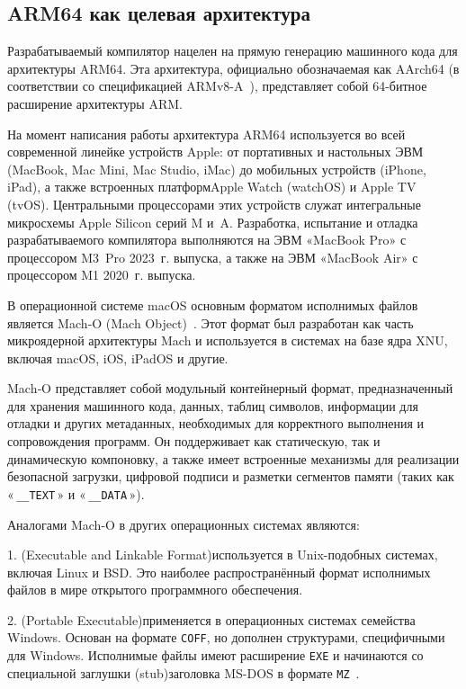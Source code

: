 \documentclass[utf8]{lgu}
\newcommand{\tire}{\unskip\nobreak\thinspace\textemdash\thinspace}
\newcommand{\code}[1]{{\normalsize\texttt{#1}}}
\begin{document}
\subsection{ARM64 как целевая архитектура}

\firstparskip Разрабатываемый компилятор нацелен на прямую генерацию машинного кода для архитектуры ARM64. Эта архитектура, официально обозначаемая как AArch64 (в соответствии со спецификацией ARMv8-A~\cite{ARMv8Manual}), представляет собой 64-битное расширение архитектуры ARM.

На момент написания работы архитектура ARM64 используется во всей современной линейке устройств Apple: от портативных и настольных ЭВМ (MacBook, Mac Mini, Mac Studio, iMac) до мобильных устройств (iPhone, iPad), а также встроенных платформ\tire Apple Watch (watchOS) и Apple TV (tvOS). Центральными процессорами этих устройств служат интегральные микросхемы Apple Silicon серий M и~A. Разработка, испытание и отладка разрабатываемого компилятора выполняются на ЭВМ «MacBook Pro» с процессором M3~Pro 2023~г. выпуска, а также на ЭВМ «MacBook Air» с процессором M1 2020~г. выпуска.

В операционной системе macOS основным форматом исполнимых файлов является Mach‑O (Mach Object)~\cite{MachOFormat}. Этот формат был разработан как часть микроядерной архитектуры Mach и используется в системах на базе ядра XNU, включая macOS, iOS, iPadOS и другие.

Mach‑O представляет собой модульный контейнерный формат, предназначенный для хранения машинного кода, данных, таблиц символов, информации для отладки и других метаданных, необходимых для корректного выполнения и сопровождения программ. Он поддерживает как статическую, так и динамическую компоновку, а также имеет встроенные механизмы для реализации безопасной загрузки, цифровой подписи и разметки сегментов памяти (таких как «\,\code{\_\_TEXT}\,» и «\,\code{\_\_DATA}\,»).

Аналогами Mach‑O в других операционных системах являются:

1.\hspace{0.5em}\code{ELF} (Executable and Linkable Format)\tire используется в Unix-подобных системах, включая Linux и BSD. Это наиболее распространённый формат исполнимых файлов в мире открытого программного обеспечения.

2.\hspace{0.5em}\code{PE} (Portable Executable)\tire применяется в операционных системах семейства Windows. Основан на формате \code{COFF}, но дополнен структурами, специфичными для Windows. Исполнимые файлы имеют расширение \code{EXE} и начинаются со специальной заглушки (stub)\tire заголовка MS-DOS в формате \code{MZ}~\cite[с.~8]{Win32PE}.
\end{document}
